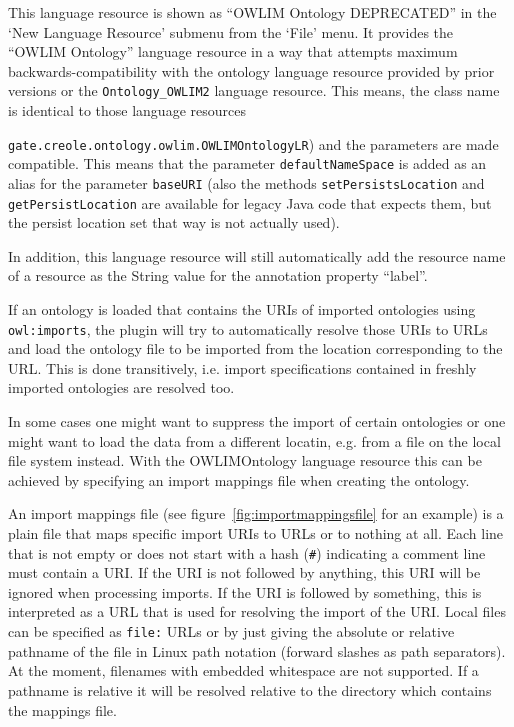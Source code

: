 This language resource is shown as ``OWLIM Ontology DEPRECATED'' in the `New
Language Resource' submenu from the `File' menu. It provides the
``OWLIM Ontology'' language resource in
a way that attempts maximum backwards-compatibility with the ontology language
resource provided by prior versions or the \texttt{Ontology\_OWLIM2} 
language resource. This means, the class name is identical to those
language resources {\texttt{gate.creole.ontology.owlim.OWLIMOntologyLR}) and
the parameters are made compatible. This means that the parameter
\texttt{defaultNameSpace} is added as an alias for the parameter
\texttt{baseURI} (also the methods \texttt{setPersistsLocation} and 
\texttt{getPersistLocation} are available for legacy Java code that expects
them, but the persist location set that way is not actually used).

In addition, this language resource will still automatically add the resource
name of a resource as the String value for the annotation property ``label''.


If an ontology is loaded that contains the URIs of imported ontologies
using \texttt{owl:imports}, the plugin will try to automatically resolve
those URIs to URLs and load the ontology file to be imported from the location
corresponding to the URL. 
This is done transitively, i.e. import specifications contained in freshly
imported ontologies are resolved too.

In some cases one might want to suppress the import of certain ontologies or
one might want to load the data from a different locatin, e.g. from a file
on the local file system instead. With the OWLIMOntology language resource
this can be achieved by specifying an import mappings file when creating 
the ontology.

An import mappings file (see figure~\ref{fig:importmappingsfile} for an example)
is a plain file that maps specific import URIs to 
URLs or to nothing at all. Each line that is not empty or does not start 
with a hash (\verb|#|) indicating a comment line must contain a URI.
If the URI is not followed by anything, this URI will be ignored when 
processing imports. If the URI is followed by something, this is interpreted
as a URL that is used for resolving the import of the URI. Local files
can be specified as \texttt{file:} URLs or by just giving the absolute
or relative pathname of the file in Linux path notation (forward slashes
as path separators). At the moment, filenames with embedded whitespace
are not supported. If a pathname is relative it will be resolved relative
to the directory which contains the mappings file.

}
